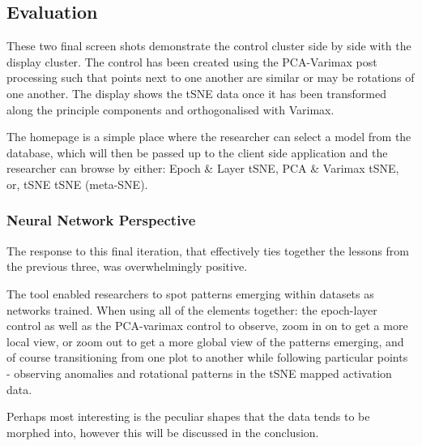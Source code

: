 \documentclass[a4paper,11pt,titlepage]{article}
\begin{document}
\subsection{Evaluation}
These two final screen shots demonstrate the control cluster side by side with the display cluster. The control has been created using the PCA-Varimax post processing such that points next to one another are similar or may be rotations of one another. The display shows the tSNE data once it has been transformed along the principle components and orthogonalised with Varimax. 
\par 
The homepage is a simple place where the researcher can select a model from the database, which will then be passed up to the client side application and the researcher can browse by either: Epoch \& Layer tSNE, PCA \& Varimax tSNE, or, tSNE tSNE (meta-SNE).

	\begin{figure}[H]
    			\centering	
    			 \qquad
    			\caption{}%
    			\label{fig:pca_varimax}
	\end{figure}

	\subsubsection{Neural Network Perspective}
	The response to this final iteration, that effectively ties together the lessons from the previous three, was overwhelmingly positive.
	\par 
	The tool enabled researchers to spot patterns emerging within datasets as networks trained. When using all of the elements together: the epoch-layer control as well as the PCA-varimax control to observe, zoom in on to get a more local view, or zoom out to get a more global view of the patterns emerging, and of course transitioning from one plot to another while following particular points - observing anomalies and rotational patterns in the tSNE mapped activation data.
	\par 
	Perhaps most interesting is the peculiar shapes that the data tends to be morphed into, however this will be discussed in the conclusion.
	
\end{document}
